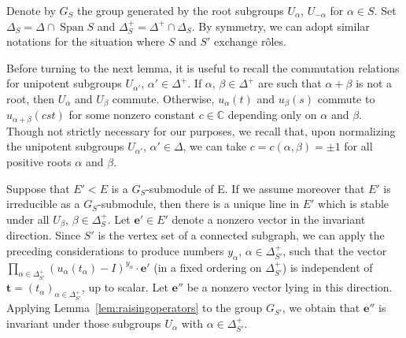 \documentclass{amsart}
\theoremstyle{plain}
\theoremstyle{definition}
\theoremstyle{remark}
\newcommand{\Vect}[1]{\mathbold{#1}}
\begin{document}
Denote by $G_{S}$ the group generated by the root subgroups $U_{\alpha}$, $U_{-\alpha}$
for $\alpha \in S$. Set $\Delta_{S} = \Delta \cap \operatorname{Span}
S$ and $\Delta^{+}_{S} =
\Delta^{+} \cap \Delta_{S}$. By symmetry, we can adopt similar notations for the situation
where $S$ and $S'$ exchange r\^oles.

Before turning to the next lemma, it is useful to recall the commutation relations for
unipotent subgroups $U_{\alpha'}$, $\alpha' \in \Delta^{+}$. If $\alpha$, $\beta \in
\Delta^{+}$ are such that
$\alpha + \beta$ is not a root, then $U_{\alpha}$ and $U_{\beta}$ commute. Otherwise,
$u_{\alpha}(t)$ and $u_{\beta}(s)$ commute to $u_{\alpha + \beta}(cst)$
for some nonzero constant $c \in \mathbb{C}$ depending only on $\alpha$ and $\beta$. Though not
strictly necessary for our purposes, we recall that, upon normalizing the unipotent
subgroups $U_{\alpha'}$, $\alpha' \in \Delta$, we can take $c = c(\alpha, \beta) = \pm
1$ for all positive roots $\alpha$ and $\beta$.

Suppose that $E' < E$ is a $G_{S}$-submodule of E. If we assume moreover that $E'$ is irreducible as a $G_{S}$-submodule, then there is a unique line in $E'$ which
is stable under all $U_{\beta}$, $\beta \in \Delta^{+}_{S}$. Let $\Vect{e}' \in E'$
denote a nonzero vector in the invariant direction.
Since $S'$ is the vertex set of a connected subgraph,
we can apply the preceding considerations to produce numbers
$y_{\alpha}$, $\alpha \in \Delta_{S'}^{+}$, such that the vector
$\prod_{\alpha \in \Delta_{S'}^{+}} (u_{\alpha}(t_{\alpha}) - I)^{y_{\alpha}} \cdot \Vect{e}'$
(in a fixed ordering on $\Delta_{S'}^{+}$) is independent of $\Vect{t} = (t_{\alpha})_{\alpha \in \Delta_{S'}^{+}}$, up to
scalar.
Let $\Vect{e}''$ be a nonzero vector lying in this direction. Applying
Lemma~\ref{lem:raisingoperators} to the group $G_{S'}$, we obtain that
$\Vect{e}''$ is invariant under those subgroups $U_{\alpha}$ with $\alpha \in
\Delta_{S'}^{+}$.
\end{document}
